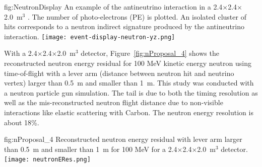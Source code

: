 \begin{dunefigure}{fig:NeutronDisplay}
{An example of the antineutrino
interaction in a 2.4$\times$2.4$\times$2.0~m$^{3}$ . 
The number of photo-electrons (PE) is plotted.
An isolated cluster of hits 
corresponds to a neutron indirect signature produced by the antineutrino interaction.}
  \texttt{[image: event-display-neutron-yz.png]}
\end{dunefigure}

With a 2.4$\times$2.4$\times$2.0~m$^{3}$  detector, Figure~\ref{fig:nProposal_4} shows 
the reconstructed neutron energy residual for 100 MeV kinetic energy neutron using time-of-flight with a lever arm (distance between neutron hit and neutrino vertex) larger than 0.5~m and smaller than 1~m.
This study was conducted with a neutron particle gun simulation.
The tail is due to both the timing resolution as well as the mis-reconstructed neutron flight distance due to non-visible interactions like elastic scattering with Carbon.
The neutron energy resolution is about 18\%. \\
\begin{dunefigure}{fig:nProposal_4}
{Reconstructed neutron energy residual with lever arm larger than 0.5~m and smaller than 1~m for 100 MeV for a 2.4$\times$2.4$\times$2.0~m$^{3}$  detector.}
  \texttt{[image: neutronERes.png]}
\end{dunefigure}

